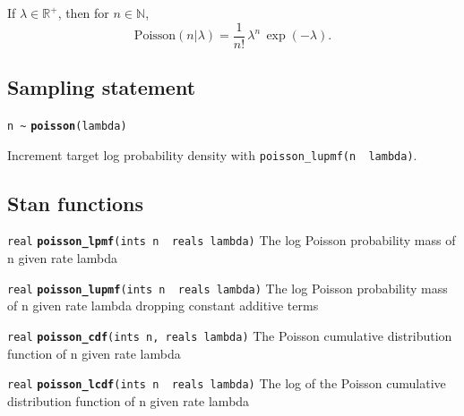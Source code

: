 \documentclass[
  10pt,
]{book}
\begin{document}
If \(\lambda \in \mathbb{R}^+\), then for \(n \in \mathbb{N}\), \[
\text{Poisson}(n|\lambda) = \frac{1}{n!} \, \lambda^n \,
\exp(-\lambda). \]

\hypertarget{sampling-statement-17}{%
\subsection{Sampling statement}\label{sampling-statement-17}}

\texttt{n\ \textasciitilde{}} \textbf{\texttt{poisson}}\texttt{(lambda)}

Increment target log probability density with \texttt{poisson\_lupmf(n\ \textbar{}\ lambda)}.

\hypertarget{stan-functions-16}{%
\subsection{Stan functions}\label{stan-functions-16}}


\texttt{real} \textbf{\texttt{poisson\_lpmf}}\texttt{(ints\ n\ \textbar{}\ reals\ lambda)}\newline
The log Poisson probability mass of n given rate lambda


\texttt{real} \textbf{\texttt{poisson\_lupmf}}\texttt{(ints\ n\ \textbar{}\ reals\ lambda)}\newline
The log Poisson probability mass of n given rate lambda dropping constant
additive terms


\texttt{real} \textbf{\texttt{poisson\_cdf}}\texttt{(ints\ n,\ reals\ lambda)}\newline
The Poisson cumulative distribution function of n given rate lambda


\texttt{real} \textbf{\texttt{poisson\_lcdf}}\texttt{(ints\ n\ \textbar{}\ reals\ lambda)}\newline
The log of the Poisson cumulative distribution function of n given
rate lambda

\end{document}
